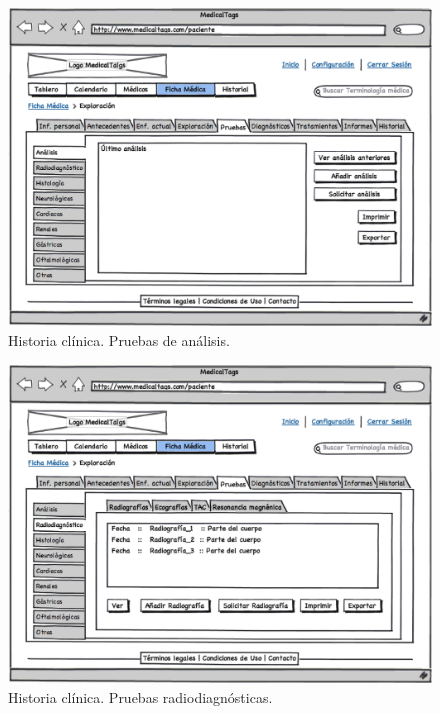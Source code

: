			
			
			\begin{figure}[H]
			  \centering
			    \includegraphics[width=12cm]{img/eps/34_Pruebas_Pacientes.eps}
			  \caption{Historia clínica. Pruebas de análisis.}
			  \label{fig:prueba_analisis}
			\end{figure}
			
			\begin{figure}[H]
			  \centering
			    \includegraphics[width=12cm]{img/eps/35_Pruebas_Pacientes2.eps}
			  \caption{Historia clínica. Pruebas radiodiagnósticas.}
			  \label{fig:prueba_radio}
			\end{figure}
				
